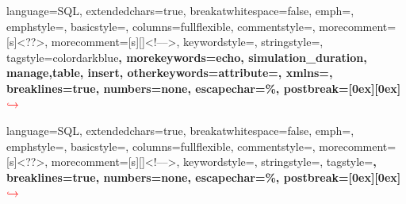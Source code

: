  {
    language=SQL,
    extendedchars=true,
    breakatwhitespace=false,
    emph={},
    emphstyle=\color{red},
    basicstyle=\ttfamily,
    columns=fullflexible,
    commentstyle=\color{gray}\upshape,
    morecomment=[s]{<?}{?>},
    morecomment=[s][\color{forestgreen}]{<!--}{-->},
    keywordstyle=\color{blue}\ttfamily,
    stringstyle=\ttfamily\color{black}\normalfont,
    tagstyle=color{darkblue}\bf,
    morekeywords={echo, simulation_duration, manage,table, insert},
    otherkeywords={attribute=, xmlns=},
    breaklines=true,                 
    numbers=none,
    escapechar=\%,
    postbreak=\raisebox{0ex}[0ex][0ex]{\ensuremath{\color{red}\hookrightarrow\space}}
}

 {
    language=SQL,
    extendedchars=true,
    breakatwhitespace=false,
    emph={},
    emphstyle=\color{red},
    basicstyle=\ttfamily,
    columns=fullflexible,
    commentstyle=\color{gray}\upshape,
    morecomment=[s]{<?}{?>},
    morecomment=[s][\color{forestgreen}]{<!--}{-->},
    keywordstyle=\color{blue}\ttfamily,
    stringstyle=\ttfamily\color{black}\normalfont,
    tagstyle=\color{darkblue}\bf,
    breaklines=true,                 
    numbers=none,
    escapechar=\%,
    postbreak=\raisebox{0ex}[0ex][0ex]{\ensuremath{\color{red}\hookrightarrow\space}}
}



